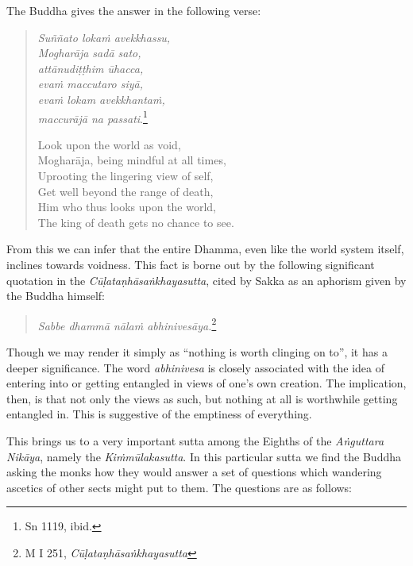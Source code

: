 The Buddha gives the answer in the following verse:

\begin{quote}
\emph{Suññato lokaṁ avekkhassu,}\\
\emph{Mogharāja sadā sato,}\\
\emph{attānudiṭṭhim ūhacca,}\\
\emph{evaṁ maccutaro siyā,}\\
\emph{evaṁ lokam avekkhantaṁ,}\\
\emph{maccurājā na passati}.\footnote{Sn 1119, ibid.}

Look upon the world as void,\\
Mogharāja, being mindful at all times,\\
Uprooting the lingering view of self,\\
Get well beyond the range of death,\\
Him who thus looks upon the world,\\
The king of death gets no chance to see.
\end{quote}

From this we can infer that the entire Dhamma, even like the world system itself, inclines towards voidness. This fact is borne out by the following significant quotation in the \emph{Cūḷataṇhāsaṅkhayasutta}, cited by Sakka as an aphorism given by the Buddha himself:

\begin{quote}
\emph{Sabbe dhammā nālaṁ abhinivesāya.}\footnote{M I 251, \emph{Cūḷataṇhāsaṅkhayasutta}}
\end{quote}

Though we may render it simply as ``nothing is worth clinging on to'', it has a deeper significance. The word \emph{abhinivesa} is closely associated with the idea of entering into or getting entangled in views of one's own creation. The implication, then, is that not only the views as such, but nothing at all is worthwhile getting entangled in. This is suggestive of the emptiness of everything.

This brings us to a very important sutta among the Eighths of the \emph{Aṅguttara Nikāya}, namely the \emph{Kiṁmūlakasutta}. In this particular sutta we find the Buddha asking the monks how they would answer a set of questions which wandering ascetics of other sects might put to them. The questions are as follows:

